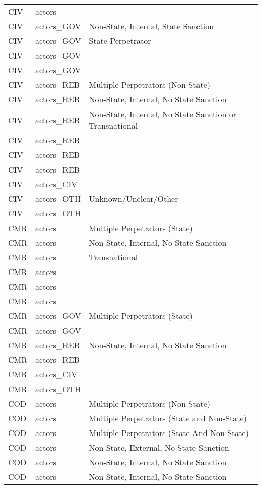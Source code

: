 \begin{table}[ht]
\begin{tabular}{lll}
  CIV & actors &  \\ 
  CIV & actors\_GOV & Non-State, Internal, State Sanction \\ 
  CIV & actors\_GOV & State Perpetrator \\ 
  CIV & actors\_GOV &  \\ 
  CIV & actors\_GOV &  \\ 
  CIV & actors\_REB & Multiple Perpetrators (Non-State) \\ 
  CIV & actors\_REB & Non-State, Internal, No State Sanction \\ 
  CIV & actors\_REB & Non-State, Internal, No State Sanction or Transnational \\ 
  CIV & actors\_REB &  \\ 
  CIV & actors\_REB &  \\ 
  CIV & actors\_REB &  \\ 
  CIV & actors\_CIV &  \\ 
  CIV & actors\_OTH & Unknown/Unclear/Other \\ 
  CIV & actors\_OTH &  \\ 
  CMR & actors & Multiple Perpetrators (State) \\ 
  CMR & actors & Non-State, Internal, No State Sanction \\ 
  CMR & actors & Transnational \\ 
  CMR & actors &  \\ 
  CMR & actors &  \\ 
  CMR & actors &  \\ 
  CMR & actors\_GOV & Multiple Perpetrators (State) \\ 
  CMR & actors\_GOV &  \\ 
  CMR & actors\_REB & Non-State, Internal, No State Sanction \\ 
  CMR & actors\_REB &  \\ 
  CMR & actors\_CIV &  \\ 
  CMR & actors\_OTH &  \\ 
  COD & actors & Multiple Perpetrators (Non-State) \\ 
  COD & actors & Multiple Perpetrators (State and Non-State) \\ 
  COD & actors & Multiple Perpetrators (State And Non-State) \\ 
  COD & actors & Non-State, External, No State Sanction \\ 
  COD & actors & Non-State, Internal, No State Sanction \\ 
  COD & actors & Non-State, Internal, No State Sanction \\ 

\end{tabular}
\end{table}

